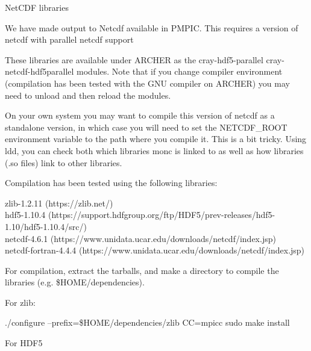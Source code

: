 \documentclass{beamer}
\newenvironment{Shaded}{}{}
\newcommand{\FunctionTok}[1]{\textcolor[rgb]{0.00,0.00,0.00}{{#1}}}
\newcommand{\VariableTok}[1]{\textcolor[rgb]{0.00,0.00,0.00}{{#1}}}
\newcommand{\ExtensionTok}[1]{{#1}}
\newcommand{\NormalTok}[1]{{#1}}
\begin{document}
\begin{frame}[fragile]{NetCDF libraries}
\protect\hypertarget{netcdf-libraries}{}

We have made output to Netcdf available in PMPIC. This requires a
version of netcdf with parallel netcdf support

These libraries are available under ARCHER as the cray-hdf5-parallel
cray-netcdf-hdf5parallel modules. Note that if you change compiler
environment (compilation has been tested with the GNU compiler on
ARCHER) you may need to unload and then reload the modules.

On your own system you may want to compile this version of netcdf as a
standalone version, in which case you will need to set the NETCDF\_ROOT
environment variable to the path where you compile it. This is a bit
tricky. Using ldd, you can check both which libraries monc is linked to
as well as how libraries (.so files) link to other libraries.

Compilation has been tested using the following libraries:

zlib-1.2.11 (https://zlib.net/)\\
hdf5-1.10.4
(https://support.hdfgroup.org/ftp/HDF5/prev-releases/hdf5-1.10/hdf5-1.10.4/src/)\\
netcdf-4.6.1 (https://www.unidata.ucar.edu/downloads/netcdf/index.jsp)\\
netcdf-fortran-4.4.4
(https://www.unidata.ucar.edu/downloads/netcdf/index.jsp)

For compilation, extract the tarballs, and make a directory to compile
the libraries (e.g. \$HOME/dependencies).

For zlib:

\begin{Shaded}
\begin{Highlighting}[]
\ExtensionTok{./configure}\NormalTok{ --prefix=}\VariableTok{\$HOME}\NormalTok{/dependencies/zlib CC=mpicc  }
\FunctionTok{sudo}\NormalTok{ make install}
\end{Highlighting}
\end{Shaded}

For HDF5

\begin{Shaded}
\end{Shaded}


\end{frame}
\end{document}
